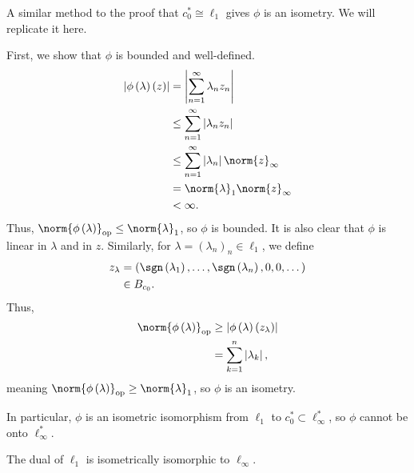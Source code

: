 \documentclass[10pt]{mypackage}
\begin{document}
\begin{solution}
  A similar method to the proof that $c_0^{\ast}\cong \ell_1$ gives $\phi$ is an isometry. We will replicate it here.\newline

  First, we show that $\phi$ is bounded and well-defined.
  \begin{align*}
    \left\vert \phi\left(\lambda\right)\left(z\right) \right\vert &= \left\vert \sum_{n=1}^{\infty}\lambda_nz_n \right\vert\\
                                                                  &\leq \sum_{n=1}^{\infty}\left\vert \lambda_nz_n \right\vert\\
                                                                  &\leq \sum_{n=1}^{\infty}\left\vert \lambda_n \right\vert\norm{z}_{\infty}\\
                                                                  &= \norm{\lambda}_1\norm{z}_{\infty}\\
                                                                  &< \infty.
  \end{align*}
  Thus, $\norm{\phi\left(\lambda\right)}_{\text{op}}\leq \norm{\lambda}_1$, so $\phi$ is bounded. It is also clear that $\phi$ is linear in $\lambda$ and in $z$. Similarly, for $\lambda = \left(\lambda_n\right)_n\in \ell_1$, we define
  \begin{align*}
    z_{\lambda} &= \left(\sgn\left(\lambda_1\right),\dots,\sgn\left(\lambda_n\right),0,0,\dots\right)\\
                &\in B_{c_0}.
  \end{align*}
  Thus, 
  \begin{align*}
    \norm{\phi\left(\lambda\right)}_{\text{op}} &\geq \left\vert \phi\left(\lambda\right)\left(z_{\lambda}\right) \right\vert\\
                                                &= \sum_{k=1}^{n}\left\vert \lambda_k \right\vert,
  \end{align*}
  meaning $\norm{\phi\left(\lambda\right)}_{\text{op}} \geq \norm{\lambda}_1$, so $\phi$ is an isometry.\newline

  In particular, $\phi$ is an isometric isomorphism from $\ell_1$ to $c_0^{\ast}\subset \ell_{\infty}^{\ast}$, so $\phi$ cannot be onto $\ell_{\infty}^{\ast}$.
\end{solution}
\begin{proposition}
  The dual of $\ell_1$ is isometrically isomorphic to $\ell_{\infty}$.
\end{proposition}
\end{document}
